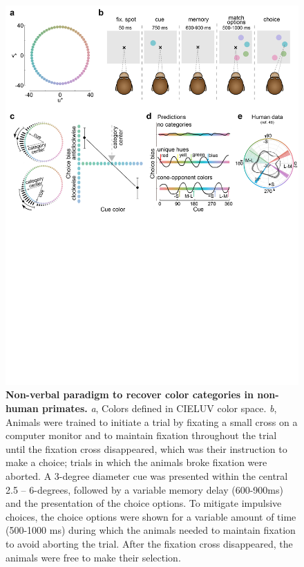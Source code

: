 \begin{figure}
    \begin{fullwidth}
    \centering
    \includegraphics[width=\textwidth+4cm,trim={0 12.5cm 0 0},clip]{../Figures/flat/F1_ParadigmPredictions_6.jpg}
    \caption{\textbf{Non-verbal paradigm to recover color categories in non-human primates.}
    \emph{a}, Colors defined in CIELUV color space. 
	\emph{b}, Animals were trained to initiate a trial by fixating a small cross on a computer monitor and to maintain fixation throughout the trial until the fixation cross disappeared, which was their instruction to make a choice; trials in which the animals broke fixation were aborted. 
	A 3-degree diameter cue was presented within the central 2.5 – 6-degrees, followed by a variable memory delay (600-900ms) and the presentation of the choice options. 
	To mitigate impulsive choices, the choice options were shown for a variable amount of time (500-1000 ms) during which the animals needed to maintain fixation to avoid aborting the trial. After the fixation cross disappeared, the animals were free to make their selection. 
}
\end{fullwidth}
\end{figure}
